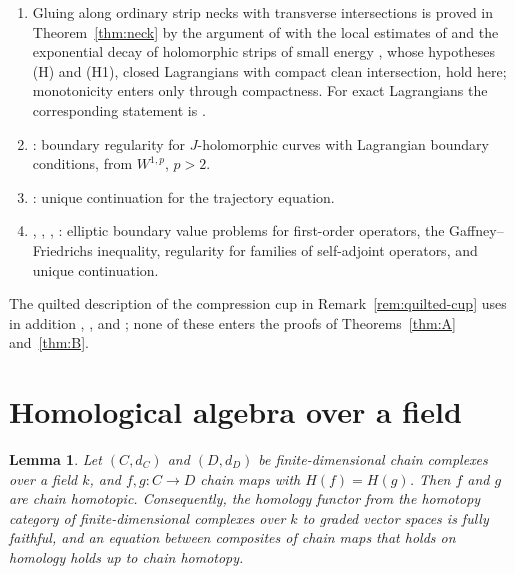 \documentclass[11pt]{amsart}
\newtheorem{lemma}[theorem]{Lemma}
\theoremstyle{definition}
\theoremstyle{remark}
\theoremstyle{plain}
\numberwithin{equation}{section}
\begin{document}
\begin{enumerate}[label=(\arabic*),leftmargin=2em]
\item Gluing along ordinary strip necks with transverse intersections is
  proved in Theorem~\ref{thm:neck} by the argument of
  \cite[Section~3]{Donaldson-book} with the local estimates of
  \cite[Section~4]{DFL-mixed} and the exponential decay of holomorphic strips
  of small energy \cite[Proposition~2.3.1]{Simcevic}, whose hypotheses (H) and (H1),
  closed Lagrangians with compact clean intersection, hold here; monotonicity enters
  only through compactness. For exact Lagrangians the corresponding statement is
  \cite[Proposition~2.22]{Seidel-LES}.
\item \cite[Theorem~B.4.1]{MS}: boundary regularity for $J$-holomorphic
  curves with Lagrangian boundary conditions, from $W^{1,p}$, $p>2$.
\item \cite[Proposition~8.6, Theorem~C.1]{SW-lagrangian}: unique
  continuation for the trajectory equation.
\item \cite{BB}, \cite[Corollary~2.1.6, Theorem~2.1.7]{Schwarz}, \cite{Robbin-Salamon},
  \cite{Aronszajn}: elliptic boundary value problems for first-order
  operators, the Gaffney--Friedrichs inequality, regularity for
  families of self-adjoint operators, and unique continuation.
\end{enumerate}
The quilted description of the compression cup in
Remark~\ref{rem:quilted-cup} uses in addition \cite[Corollary~5.5]{WW-relative},
\cite{WW-quilt}, \cite{WW-composition} and \cite[Theorem~2 and Corrigendum,
Remark~1(1)]{LL-composition}; none of these enters the proofs of
Theorems~\ref{thm:A} and~\ref{thm:B}.

\section{Homological algebra over a field}\label{app:algebra}

\begin{lemma}\label{lem:field}
Let $(C,d_C)$ and $(D,d_D)$ be finite-dimensional chain complexes over a
field $k$, and $f,g\colon C\to D$ chain maps with $H(f)=H(g)$. Then $f$
and $g$ are chain homotopic. Consequently, the homology functor from the
homotopy category of finite-dimensional complexes over $k$ to graded
vector spaces is fully faithful, and an equation between composites of
chain maps that holds on homology holds up to chain homotopy.
\end{lemma}
\end{document}

